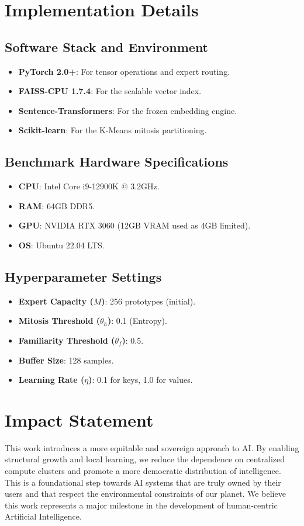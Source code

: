 \documentclass[11pt,hidelinks]{article}
\begin{document}
\section{Implementation Details}
\subsection{Software Stack and Environment}
\begin{itemize}
    \item \textbf{PyTorch 2.0+}: For tensor operations and expert routing.
    \item \textbf{FAISS-CPU 1.7.4}: For the scalable vector index.
    \item \textbf{Sentence-Transformers}: For the frozen embedding engine.
    \item \textbf{Scikit-learn}: For the K-Means mitosis partitioning.
\end{itemize}

\subsection{Benchmark Hardware Specifications}
\begin{itemize}
    \item \textbf{CPU}: Intel Core i9-12900K @ 3.2GHz.
    \item \textbf{RAM}: 64GB DDR5.
    \item \textbf{GPU}: NVIDIA RTX 3060 (12GB VRAM used as 4GB limited).
    \item \textbf{OS}: Ubuntu 22.04 LTS.
\end{itemize}

\subsection{Hyperparameter Settings}
\begin{itemize}
    \item \textbf{Expert Capacity ($M$)}: 256 prototypes (initial).
    \item \textbf{Mitosis Threshold ($\theta_h$)}: 0.1 (Entropy).
    \item \textbf{Familiarity Threshold ($\theta_f$)}: 0.5.
    \item \textbf{Buffer Size}: 128 samples.
    \item \textbf{Learning Rate ($\eta$)}: 0.1 for keys, 1.0 for values.
\end{itemize}

\section{Impact Statement}
This work introduces a more equitable and sovereign approach to AI. By enabling structural growth and local learning, we reduce the dependence on centralized compute clusters and promote a more democratic distribution of intelligence. This is a foundational step towards AI systems that are truly owned by their users and that respect the environmental constraints of our planet. We believe this work represents a major milestone in the development of human-centric Artificial Intelligence.



\end{document}
